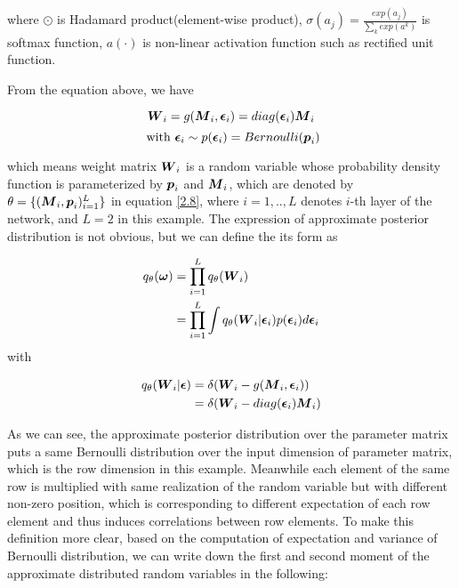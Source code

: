 where $\odot$ is Hadamard product(element-wise product), $\sigma(a_{j}) = \frac{exp({a_{j}})}{\sum_{k}exp({a^{k}})}$ is softmax function, $a(\cdot)$ is non-linear activation function such as rectified unit function.
  
From the equation above, we have 

\[
\boldsymbol W_{i} = g(\boldsymbol M_{i}, \boldsymbol \epsilon_{i})= diag(\boldsymbol \epsilon_{i}) \boldsymbol M_{i} 
\]
\[ 
\text{ with } \boldsymbol \epsilon_{i} \sim p(\boldsymbol \epsilon_{i}) = Bernoulli(\boldsymbol p_{i}) 
\]

which means weight matrix $\boldsymbol W_{i}$ is a random variable whose probability density function is parameterized by $\boldsymbol p_{i}$ and $\boldsymbol M_{i}$, which are denoted by $\theta = \{ (\boldsymbol M_{i}, \boldsymbol p_{i})_{i=1}^{L} \}$ in equation \ref{2.8}, where $i = {1,..,L}$ denotes $i$-th layer of the network, and $L = 2$ in this example. 
The expression of approximate posterior distribution is not obvious, but we can define the its form as 

\begin{equation}
\begin{aligned} \label{appro_dist_form}
q_{\theta}(\boldsymbol \omega) &= \prod_{i=1}^{L} q_{\theta}(\boldsymbol W_{i})\\
&= \prod_{i=1}^{L}\int q_{\theta}(\boldsymbol W_{i} | \boldsymbol \epsilon_{i})p(\boldsymbol \epsilon_{i}) d\boldsymbol \epsilon_{i} 
\end{aligned}
\end{equation}
with

\begin{equation}
\begin{aligned} \label{appro_cond_dist_form}
q_{\theta}(\boldsymbol W_{i}|\boldsymbol \epsilon) &= \delta(\boldsymbol W_{i} - g(\boldsymbol M_{i}, \boldsymbol \epsilon_{i}))  \\
& = \delta(\boldsymbol W_{i} - diag(\boldsymbol \epsilon_{i})\boldsymbol M_{i})
\end{aligned}
\end{equation}

As we can see, the approximate posterior distribution over the parameter matrix puts a same Bernoulli distribution over the input dimension of parameter matrix, which is the row dimension in this example.  Meanwhile each element of the same row is multiplied with same realization of the random variable but with different non-zero position, which is corresponding to different expectation of each row element and thus induces correlations between row elements. To make this definition more clear, based on the computation of expectation and variance of Bernoulli distribution, we can write down the first and second moment of the approximate distributed random variables in the following:

